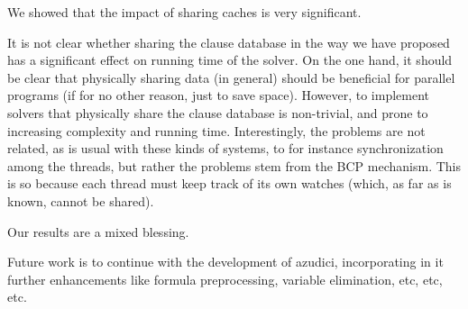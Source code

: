 We showed that the impact of sharing caches is very significant.

It is not clear whether sharing the clause database in the way we have
proposed has a significant effect on running time of the solver. On
the one hand, it should be clear that physically sharing data (in
general) should be beneficial for parallel programs (if for no other
reason, just to save space). However, to implement solvers that
physically share the clause database is non-trivial, and prone to
increasing complexity and running time. Interestingly, the problems
are not related, as is usual with these kinds of systems, to for
instance synchronization among the threads, but rather the problems
stem from the BCP mechanism. This is so because each thread must keep
track of its own watches (which, as far as is known, cannot be
shared).

Our results are a mixed blessing.


Future work is to continue with the development of  azudici,
incorporating in it further enhancements like formula preprocessing,
variable elimination, etc, etc, etc.

